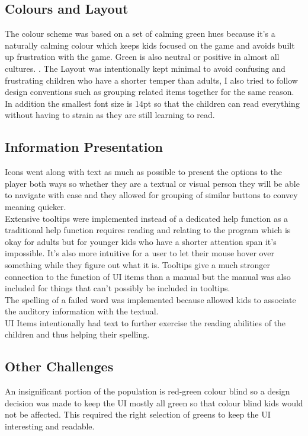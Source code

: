 \documentclass[conference]{IEEEtran}
\begin{document}
	\subsection{Colours and Layout}
	The colour scheme was based on a set of calming green hues because it's a naturally calming colour which keeps kids focused on the game and avoids built up frustration with the game. Green is also neutral or positive in almost all cultures. \cite{Green:Scott-Kemmis}. The Layout was intentionally kept minimal to avoid confusing and frustrating children who have a shorter temper than adults, I also tried to follow design conventions such as grouping related items together for the same reason.\\ In addition the smallest font size is 14pt so that the children can read everything without having to strain as they are still learning to read.
	\subsection{Information Presentation}
	Icons went along with text as much as possible to present the options to the player both ways so whether they are a textual or visual person they will be able to navigate with ease and they allowed for grouping of similar buttons to convey meaning quicker.\\
	Extensive tooltips were implemented instead of a dedicated help function as a traditional help function requires reading and relating to the program which is okay for adults but for younger kids who have a shorter attention span it's impossible. It's also more intuitive for a user to let their mouse hover over something while they figure out what it is. Tooltips give a much stronger connection to the function of UI items than a manual but the manual was also included for things that can't possibly be included in tooltips.\\
	The spelling of a failed word was implemented because allowed kids to associate the auditory information with the textual.\\
	UI Items intentionally had text to further exercise the reading abilities of the children and thus helping their spelling.
	\subsection{Other Challenges}
	An insignificant portion of the population is red-green colour blind \cite{colour:blind} so a design decision was made to keep the UI mostly all green so that colour blind kids would not be affected. This required the right selection of greens to keep the UI interesting and readable.
	
\end{document}
